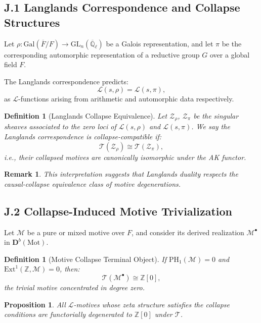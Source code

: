 \documentclass[11pt]{article}
\newtheorem{definition}[theorem]{Definition}
\newtheorem{proposition}[theorem]{Proposition}
\newtheorem{remark}[theorem]{Remark}
\newcommand{\QQ}{\mathbb{Q}}
\begin{document}
\subsection*{J.1 Langlands Correspondence and Collapse Structures}

Let $\rho : \mathrm{Gal}(\overline{F}/F) \to \mathrm{GL}_n(\overline{\QQ}_\ell)$ be a Galois representation,  
and let $\pi$ be the corresponding automorphic representation of a reductive group $G$ over a global field $F$.

The Langlands correspondence predicts:
\[
\mathcal{L}(s, \rho) = \mathcal{L}(s, \pi),
\]
as $\mathcal{L}$-functions arising from arithmetic and automorphic data respectively.

\begin{definition}[Langlands Collapse Equivalence]
Let $\mathcal{Z}_\rho$, $\mathcal{Z}_\pi$ be the singular sheaves associated to the zero loci of $\mathcal{L}(s, \rho)$ and $\mathcal{L}(s, \pi)$.  
We say the Langlands correspondence is collapse-compatible if:
\[
\mathcal{T}(\mathcal{Z}_\rho) \cong \mathcal{T}(\mathcal{Z}_\pi),
\]
i.e., their collapsed motives are canonically isomorphic under the AK functor.
\end{definition}

\begin{remark}
This interpretation suggests that Langlands duality respects the causal-collapse equivalence class of motive degenerations.
\end{remark}

\subsection*{J.2 Collapse-Induced Motive Trivialization}

Let $\mathcal{M}$ be a pure or mixed motive over $F$, and consider its derived realization $\mathcal{M}^\bullet$ in $\mathbf{D}^b(\text{Mot})$.

\begin{definition}[Motive Collapse Terminal Object]
If $\mathrm{PH}_1(\mathcal{M}) = 0$ and $\mathrm{Ext}^1(\mathbb{Z}, \mathcal{M}) = 0$, then:
\[
\mathcal{T}(\mathcal{M}^\bullet) \cong \mathbb{Z}[0],
\]
the trivial motive concentrated in degree zero.
\end{definition}

\begin{proposition}
All $\mathcal{L}$-motives whose zeta structure satisfies the collapse conditions are functorially degenerated to $\mathbb{Z}[0]$ under $\mathcal{T}$.
\end{proposition}
\end{document}
